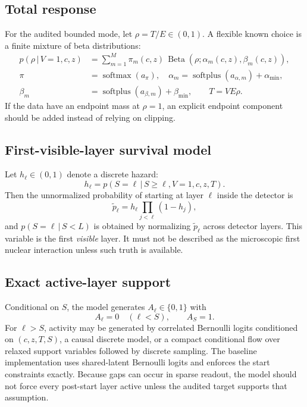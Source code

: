 \documentclass[11pt]{article}
\theoremstyle{definition}
\theoremstyle{remark}
\newcommand{\given}{\,\vert\,}
\newcommand{\softmax}{\operatorname{softmax}}
\newcommand{\BetaDist}{\operatorname{Beta}}
\begin{document}
\subsection{Total response}
For the audited bounded mode, let $\rho=T/E\in(0,1)$. A flexible known choice is a finite mixture of beta distributions:
\begin{align}
  p(\rho\given V=1,c,z)
  &=\sum_{m=1}^{M}\pi_m(c,z)\,
  \BetaDist(\rho;\alpha_m(c,z),\beta_m(c,z)),\\
  \pi&=\softmax(a_\pi),\quad
  \alpha_m=\operatorname{softplus}(a_{\alpha,m})+\alpha_{\min},\\
  \beta_m&=\operatorname{softplus}(a_{\beta,m})+\beta_{\min},
  \qquad T=V E\rho.
  \label{eq:beta_mixture}
\end{align}
If the data have an endpoint mass at $\rho=1$, an explicit endpoint component should be added instead of relying on clipping.

\subsection{First-visible-layer survival model}
Let $h_\ell\in(0,1)$ denote a discrete hazard:
\begin{equation}
  h_\ell=p(S=\ell\given S\ge\ell,V=1,c,z,T).
\end{equation}
Then the unnormalized probability of starting at layer $\ell$ inside the detector is
\begin{equation}
  \tilde p_\ell=h_\ell\prod_{j<\ell}(1-h_j),
\end{equation}
and $p(S=\ell\given S<L)$ is obtained by normalizing $\tilde p_\ell$ across detector layers. This variable is the first \emph{visible} layer. It must not be described as the microscopic first nuclear interaction unless such truth is available.

\subsection{Exact active-layer support}
Conditional on $S$, the model generates $A_\ell\in\{0,1\}$ with
\begin{equation}
  A_\ell=0\quad(\ell<S),\qquad A_S=1.
\end{equation}
For $\ell>S$, activity may be generated by correlated Bernoulli logits conditioned on $(c,z,T,S)$, a causal discrete model, or a compact conditional flow over relaxed support variables followed by discrete sampling. The baseline implementation uses shared-latent Bernoulli logits and enforces the start constraints exactly. Because gaps can occur in sparse readout, the model should not force every post-start layer active unless the audited target supports that assumption.
\end{document}
